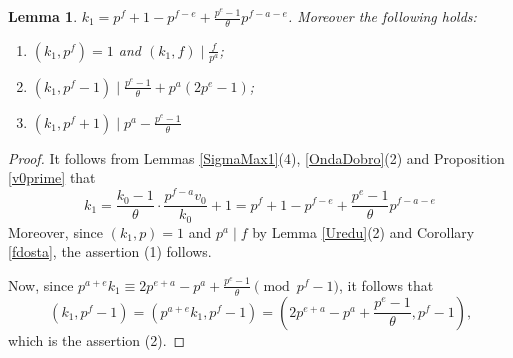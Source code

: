 \documentclass[a4paper,twopage,reqno,12pt]{amsart}
\newtheorem{lemma}[theorem]{Lemma}
\theoremstyle{definition}
\numberwithin{equation}{section}
\begin{document}
\begin{lemma}
\label{Boom}$k_{1}=p^{f}+1-p^{f-e}+\frac{p^{e}-1}{\theta }p^{f-a-e}$.
Moreover the following holds:

\begin{enumerate}
\item $\left( k_{1},p^{f}\right) =1$ and $(k_{1},f)\mid \frac{f}{p^{a}}$;

\item $\left( k_{1},p^{f}-1\right) \mid \frac{p^{e}-1}{\theta }+p^{a}\left(
2p^{e}-1\right) $;

\item $\left( k_{1},p^{f}+1\right) \mid p^{a}-\frac{p^{e}-1}{\theta }$
\end{enumerate}
\end{lemma}

\begin{proof}
It follows from Lemmas \ref{SigmaMax1}(4), \ref{OndaDobro}(2) and Proposition \ref{v0prime} that 
\[
k_{1}=\frac{k_{0}-1}{\theta }\cdot \frac{p^{f-a}v_{0}}{k_{0}}+1=p^{f}+1-p^{f-e}+\frac{p^{e}-1}{\theta }p^{f-a-e}
\]
Moreover, since $(k_{1},p)=1$ and $p^{a}\mid f$ by Lemma %
\ref{Uredu}(2) and Corollary \ref{fdosta}, the assertion (1) follows.

Now, since $p^{a+e}k_{1} \equiv 2p^{e+a}-p^{a}+\frac{p^{e}-1}{\theta } \pmod{p^{f}-1}$, it follows that
\begin{equation*}
\left( k_{1},p^{f}-1\right)=\left( p^{a+e}k_{1},p^{f}-1\right)=\left( 2p^{e+a}-p^{a}+\frac{p^{e}-1}{\theta },p^{f}-1\right)\text{,}
\end{equation*}%
which is the assertion (2).


\end{proof}
\end{document}

